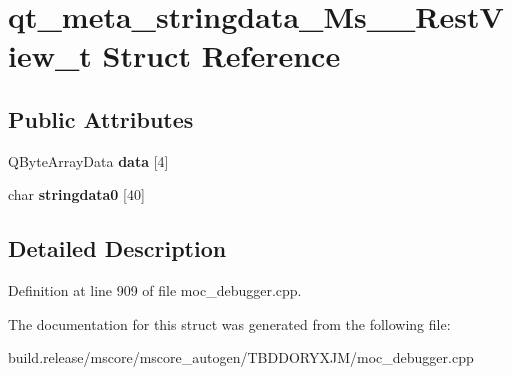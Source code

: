 \hypertarget{structqt__meta__stringdata___ms_____rest_view__t}{}\section{qt\+\_\+meta\+\_\+stringdata\+\_\+\+Ms\+\_\+\+\_\+\+Rest\+View\+\_\+t Struct Reference}
\label{structqt__meta__stringdata___ms_____rest_view__t}
\subsection*{Public Attributes}
\begin{DoxyCompactItemize}
\item 
\mbox{\label{structqt__meta__stringdata___ms_____rest_view__t_a93668853bfe89d0282d6a3f548bbaff6}} 
Q\+Byte\+Array\+Data {\bfseries data} \mbox{[}4\mbox{]}
\item 
\mbox{\label{structqt__meta__stringdata___ms_____rest_view__t_a5de9628243c3314efd6985bf3fd4366a}} 
char {\bfseries stringdata0} \mbox{[}40\mbox{]}
\end{DoxyCompactItemize}


\subsection{Detailed Description}


Definition at line 909 of file moc\+\_\+debugger.\+cpp.



The documentation for this struct was generated from the following file\+:\begin{DoxyCompactItemize}
\item 
build.\+release/mscore/mscore\+\_\+autogen/\+T\+B\+D\+D\+O\+R\+Y\+X\+J\+M/moc\+\_\+debugger.\+cpp\end{DoxyCompactItemize}
